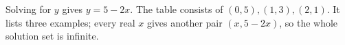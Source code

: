 Solving for $y$ gives $y=5-2x$. The table consists of $(0,5),(1,3),(2,1)$. It lists three examples; every real $x$ gives another pair $(x,5-2x)$, so the whole solution set is infinite.
